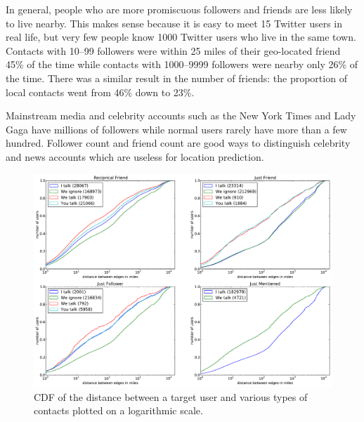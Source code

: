 \documentclass[letterpaper]{article}
\begin{document}
In general, people who are more promiscuous followers and friends are less
likely to live nearby.
%
This makes sense because it is easy to meet 15 Twitter users in real life, but
very few people know 1000 Twitter users who live in the same town.
%
Contacts with 10--99 followers were within 25 miles of their geo-located friend
45\% of the time while contacts with 1000--9999 followers were nearby only 26\%
of the time.
%
There was a similar result in the number of friends: the proportion of local
contacts went from 46\% down to 23\%.

Mainstream media and celebrity accounts such as the New York Times and Lady
Gaga have millions of followers while normal users rarely have more than a few
hundred.
%
Follower count and friend count are good ways to distinguish celebrity and news
accounts which are useless for location prediction.

\ifdefined\THESIS
    \begin{figure}[tbh]
    \centering
    \includegraphics[width=\linewidth]{figures/com_types.pdf}
    \caption{
    CDF of the distance between a target user and various types of contacts
    plotted on a logarithmic scale.
    }
    \label{fig:ComTypes}
    \end{figure}
\fi
\end{document}
